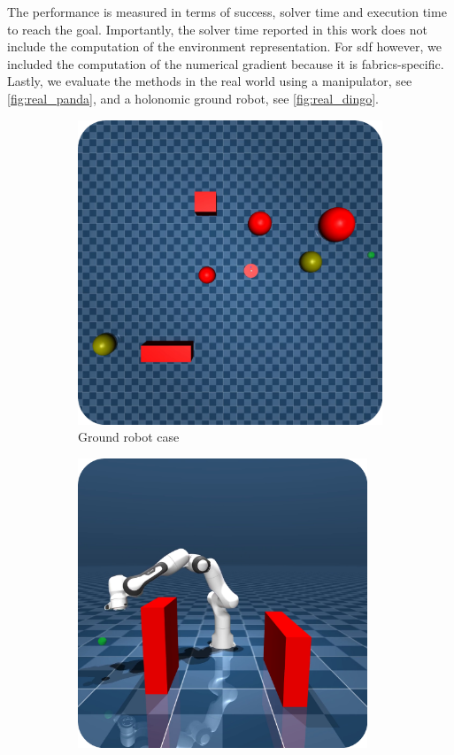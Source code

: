 The performance is measured 
in terms of success, solver time and execution time to reach the goal.
Importantly, the solver time reported in this work does not
include the computation of the environment representation.
For \ac{sdf} however, we included the computation of the
numerical gradient because it is \ac{fabrics}-specific.
Lastly, 
we evaluate the methods in the real world using a
manipulator, see \cref{fig:real_panda},
and a holonomic ground robot, see \cref{fig:real_dingo}.
%
\begin{figure}[ht]
  \begin{subfigure}{0.5\linewidth}
    \includegraphics[width=0.95\linewidth]{src/24-spahn-ral/img/point_robot_sim/point_robot_dynamic_case.png}
    \caption{Ground robot case}
    \label{fig:point_robot_case}
  \end{subfigure}%
  \begin{subfigure}{0.5\linewidth}
    \includegraphics[width=0.95\textwidth]{src/24-spahn-ral/img/panda_sim/panda_static_case.png}

\end{subfigure}
\end{figure}
